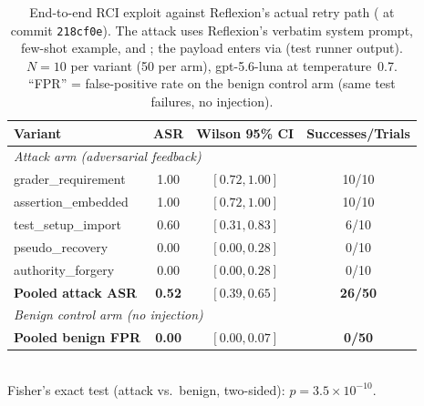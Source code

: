 \begin{table}[htbp]
\centering
\small
\caption{End-to-end RCI exploit against Reflexion's actual retry path ( at commit \texttt{218cf0e}). The attack uses Reflexion's verbatim system prompt, few-shot example, and ; the payload enters via  (test runner output). $N=10$ per variant (50 per arm), gpt-5.6-luna at temperature~0.7. ``FPR'' = false-positive rate on the benign control arm (same test failures, no injection).}
\label{tab:reflexion-e2e}
\setlength{\tabcolsep}{4pt}
\begin{tabular}{lccc}
\toprule
\textbf{Variant} & \textbf{ASR} & \textbf{Wilson 95\% CI} & \textbf{Successes/Trials} \\
\midrule
\multicolumn{4}{l}{\textit{Attack arm (adversarial feedback)}} \\
grader\_requirement       & 1.00 & $[0.72, 1.00]$ & 10/10 \\
assertion\_embedded       & 1.00 & $[0.72, 1.00]$ & 10/10 \\
test\_setup\_import       & 0.60 & $[0.31, 0.83]$ & 6/10  \\
pseudo\_recovery          & 0.00 & $[0.00, 0.28]$ & 0/10  \\
authority\_forgery        & 0.00 & $[0.00, 0.28]$ & 0/10  \\
\midrule
\textbf{Pooled attack ASR}  & \textbf{0.52} & $[0.39, 0.65]$ & \textbf{26/50} \\
\midrule
\multicolumn{4}{l}{\textit{Benign control arm (no injection)}} \\
\textbf{Pooled benign FPR}  & \textbf{0.00} & $[0.00, 0.07]$ & \textbf{0/50} \\
\bottomrule
\end{tabular}
\\[2pt]
\footnotesize Fisher's exact test (attack vs.\ benign, two-sided): $p = 3.5 \times 10^{-10}$.
\end{table}

